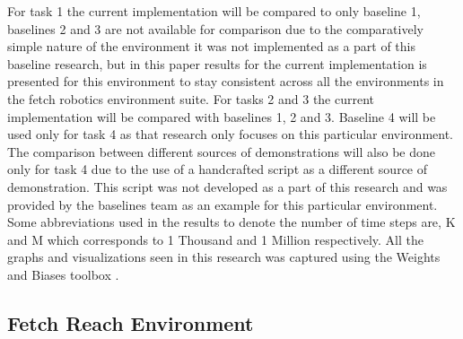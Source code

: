 For task 1 the current implementation will be compared to only baseline 1, baselines 2 and 3 are not available for comparison due to the comparatively simple nature of the environment it was not implemented as a part of this baseline research, but in this paper results for the current implementation is presented for this environment to stay consistent across all the environments in the fetch robotics environment suite. For tasks 2 and 3 the current implementation will be compared with baselines 1, 2 and 3. Baseline 4 will be used only for task 4 as that research only focuses on this particular environment. The comparison between different sources of demonstrations will also be done only for task 4 due to the use of a handcrafted script as a different source of demonstration. This script was not developed as a part of this research and was provided by the baselines team \cite{stable-baselines} as an example for this particular environment. \\

Some abbreviations used in the results to denote the number of time steps are, K and M which corresponds to 1 Thousand and 1 Million respectively. All the graphs and visualizations seen in this research was captured using the Weights and Biases toolbox \cite{wandb}. \\

\subsection{Fetch Reach Environment}

